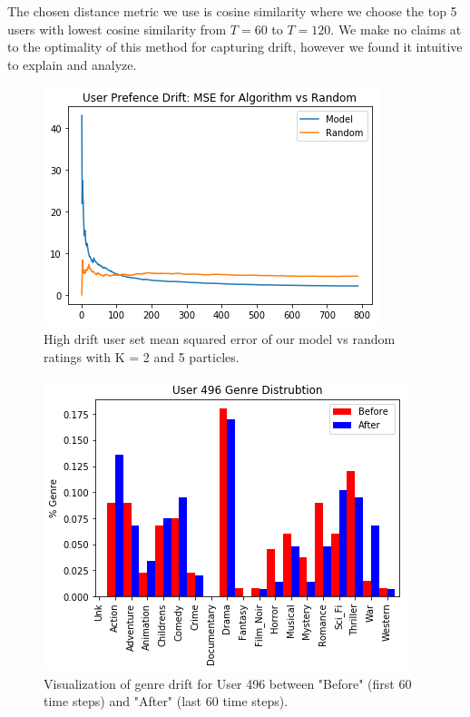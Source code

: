 \documentclass{article}
\begin{document}
The chosen distance metric we use is cosine similarity where we choose the top 5 users with lowest cosine similarity from $T=60$ to $T=120$. We make no claims at to the optimality of this method for capturing drift, however we found it intuitive to explain and analyze. 

\begin{figure}[ht]

\begin{center}
\centerline{\includegraphics[width=\columnwidth]{drift_MSE}}
\caption{High drift user set mean squared error of our model vs random ratings with K = 2 and 5 particles.}
\label{drift_MSE}
\end{center}

\vskip -0.2in
\end{figure}

\begin{figure}[ht]

\begin{center}
\centerline{\includegraphics[width=\columnwidth]{drift_histogram}}
\caption{Visualization of genre drift for User 496 between "Before" (first 60 time steps) and "After" (last 60 time steps).}
\label{drift_histogram}
\end{center}

\vskip -0.2in
\end{figure}
\end{document}
